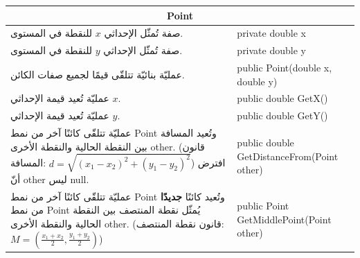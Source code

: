 \documentclass[14pt]{extarticle}
\begin{document}
\begin{center}
\renewcommand{\arraystretch}{1.8}
{\small
\begin{tabular}{|p{}|l|}
\hline
\multicolumn{2}{|c|}{\textbf{\textenglish{Point}}} \\
\hline
صفة تُمثّل الإحداثي $x$ للنقطة في المستوى. & \textenglish{private double x} \\
\hline
صفة تُمثّل الإحداثي $y$ للنقطة في المستوى. & \textenglish{private double y} \\
\hline
عمليّة بنائيّة تتلقّى قيمًا لجميع صفات الكائن. & \textenglish{public Point(double x, double y)} \\
\hline
عمليّة تُعيد قيمة الإحداثي $x$. & \textenglish{public double GetX()} \\
\hline
عمليّة تُعيد قيمة الإحداثي $y$. & \textenglish{public double GetY()} \\
\hline
عمليّة تتلقّى كائنًا آخر من نمط \textenglish{Point} وتُعيد المسافة بين النقطة الحالية والنقطة الأخرى \textenglish{other}. \newline
(قانون المسافة: $d = \sqrt{(x_1 - x_2)^2 + (y_1 - y_2)^2}$) \newline
افترض أنّ \textenglish{other} ليس \textenglish{null}. & \textenglish{public double GetDistanceFrom(Point other)} \\
\hline
عمليّة تتلقّى كائنًا آخر من نمط \textenglish{Point} وتُعيد كائنًا \textbf{جديدًا} من نمط \textenglish{Point} يُمثّل نقطة المنتصف بين النقطة الحالية والنقطة الأخرى \textenglish{other}. \newline
(قانون نقطة المنتصف: $M = (\frac{x_1 + x_2}{2}, \frac{y_1 + y_2}{2})$) & \textenglish{public Point GetMiddlePoint(Point other)} \\
\hline
\end{tabular}
}
\end{center}
\end{document}
